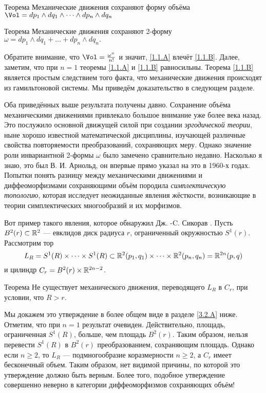 \begin{thm}{Теорема}\label{1.1.A}
Механические движения сохраняют форму объёма 
$\Vol=dp_1\wedge dq_1\wedge\dots\wedge d p_n\wedge dq_n$
\end{thm}

\begin{thm}{Теорема}\label{1.1.B}
Механические движения сохраняют 2-форму $\omega = dp_1 \wedge dq_1 +\dots
+ dp_n \wedge dq_n.$
\end{thm}

Обратите внимание, что $\Vol = \tfrac{\omega^n}{n!}$ и значит, \ref{1.1.A} влечёт \ref{1.1.B}.
Далее, заметим, что при $n = 1$ теоремы \ref{1.1.A} и \ref{1.1.B} равносильны.
Теорема \ref{1.1.B} является простым следствием того факта, что механические движения происходят из гамильтоновой системы.
Мы приведём доказательство в следующем разделе.

Оба приведённых выше результата получены давно.
Сохранение объёма механическими движениями привлекало большое внимание уже более века назад.
Это послужило основной движущей силой при создании {}\emph{эргодической теории}, ныне хорошо известной математической дисциплины, изучающей различные свойства повторяемости преобразований, сохраняющих меру.
Однако значение роли инвариантной 2-формы $\omega$ было замечено сравнительно недавно.
Насколько я знаю, это был В. И. Арнольд, он впервые прямо указал на это в 1960-х годах.
Попытки понять разницу между механическими движениями и диффеоморфизмами сохраняющими объём породила {}\emph{симплектическую топологию}, которая исследует неожиданные явления жёсткости, возникающие в теории симплектических многообразий и их морфизмов.

Вот пример такого явления, которое обнаружил Дж. -C. Сикорав \cite{S1}.
Пусть $B^2(r) \subset \mathbb{R}^2$ — евклидов диск радиуса $r$, ограниченный окружностью $S^1(r)$.
Рассмотрим тор 
\[L_R = 
S^1 (R) \times\dots\times S^1(R) \subset \mathbb{R}^2 (p_1, q_1) \times\dots\times \mathbb{R}^2 (p_n, q_n) =\mathbb{R}^{2n} (p, q)\]
и цилиндр $C_r = B^2 (r) \times \mathbb{R}^{2n-2}$.

\begin{thm}{Теорема}\label{1.1.C}
Не существует механического движения, переводящего $L_R$ в $C_r$, при условии, что $R>r$.
\end{thm}

Мы докажем это утверждение в более общем виде в разделе \ref{3.2.A} ниже.
Отметим, что при $n = 1$ результат очевиден.
Действительно, площадь, ограниченная $S^1 (R)$, больше, чем площадь $B^2 (r)$.
Таким образом, нельзя перевести $S^1(R)$ в $B^2(r)$ преобразованием, сохраняющим площадь.
Однако если $n \ge 2$, то $L_R$ — подмногообразие коразмерности $n \ge 2$, а $C_r$ имеет бесконечный объем.
Таким образом, нет видимой причины, по которой это утверждение должно быть верным.
Более того, подобное утверждение совершенно неверно в категории диффеоморфизмов сохраняющих объём!


